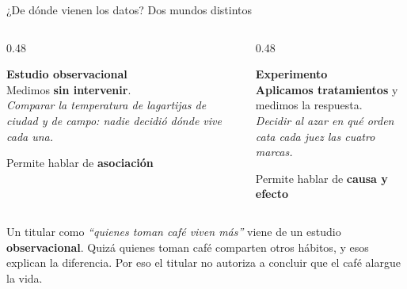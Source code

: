 \documentclass[aspectratio=169,10pt]{beamer}
\newcommand{\destaca}[1]{%
  \par\vspace{3pt}\noindent
  \colorbox{azulClaro}{%
    \parbox{\dimexpr\linewidth-2\fboxsep\relax}{\vspace{3pt}#1\vspace{3pt}}}%
  \par\vspace{3pt}}
\begin{document}
\begin{frame}{¿De dónde vienen los datos? Dos mundos distintos}
  \begin{columns}[T]
    \begin{column}{0.48\textwidth}
      \destaca{\textbf{Estudio observacional}\\[4pt]
      {\small Medimos \textbf{sin intervenir}.\\[4pt]
      \textit{Comparar la temperatura de lagartijas de ciudad y de campo:
      nadie decidió dónde vive cada una.}}}

      \vspace{0.3cm}
      \centering\textcolor{rojoAc}{\small Permite hablar de \textbf{asociación}}
    \end{column}
    \begin{column}{0.48\textwidth}
      \destaca{\textbf{Experimento}\\[4pt]
      {\small \textbf{Aplicamos tratamientos} y medimos la respuesta.\\[4pt]
      \textit{Decidir al azar en qué orden cata cada juez las cuatro marcas.}}}

      \vspace{0.3cm}
      \centering\textcolor{verdeOk}{\small Permite hablar de \textbf{causa y efecto}}
    \end{column}
  \end{columns}

  \vspace{0.6cm}
  \destaca{Un titular como \textit{``quienes toman café viven más''} viene de un estudio
  \textbf{observacional}. Quizá quienes toman café comparten otros hábitos, y esos
  explican la diferencia. Por eso el titular no autoriza a concluir que el café alargue la vida.}
\end{frame}
\end{document}
